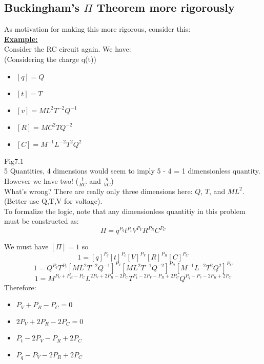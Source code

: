 \documentclass[12pt]{article}
\newcommand{\myt}[1]{\textbf{\underline{#1}}}
\begin{document}
	\subsection*{Buckingham's $\Pi$ Theorem more rigorously}
	
	As motivation for making this more rigorous, consider this:\\
	\myt{Example:}\\
	Consider the RC circuit again. We have:\\
	(Considering the charge q(t))\\
	\begin{itemize}
		\item $[q] = Q$
		\item $[t] = T$
		\item $[v] = ML^2T^{-2}Q^{-1}$
		\item $[R] = MC^2TQ^{-2}$
		\item $[C] = M^{-1}L^{-2}T^2Q^2$
	\end{itemize}
	Fig7.1\\
	
	5 Quantities, 4 dimensions would seem to imply 5 - 4 = 1 dimensionless quantity. However we have two! ($\frac{t}{RC}$ and $\frac{q}{VC}$)\\
	What's wrong? There are really only three dimensions here: $Q$, $T$, and $ML^2$. (Better use Q,T,V for voltage). \\
	To formalize the logic, note that any dimensionless quantitiy in this problem must be constructed as:\\
	
	$$\Pi = q^{P_q}t^{P_t}V^{P_V}R^{P_R}C^{P_C}$$
	
	We must have $[\Pi] = 1$ so \\
	$$1 =[q]^{P_q}[t]^{P_t}[V]^{P_V}[R]^{P_R}[C]^{P_C}$$
	$$1 = Q^{P_q}T^{P_t}[ML^2T^{-2}Q^{-1}]^{P_V}[ML^2T^{-1}Q^{-2}]^{P_R}[M^{-1}L^{-2}T^2Q^2]^{P_C}$$
	$$1 = M^{P_V + P_R - P_C}L^{2P_V + 2P_R - 2P_C}T^{P_t - 2P_V - P_R + 2P_C}Q^{P_q - P_v - 2P_R + 2P_C}$$
	Therefore:\\
	\begin{itemize}
		\item $P_V + P_R - P_C = 0$
		\item $2P_V + 2P_R - 2P_C = 0$
		\item $P_t - 2P_V - P_R + 2P_C$
		\item $P_q - P_V - 2P_R + 2P_C$
	\end{itemize}
\end{document}
